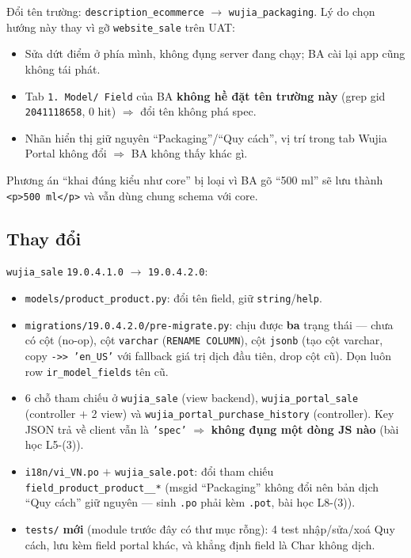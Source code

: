 Đổi tên trường: \texttt{description\_ecommerce} $\rightarrow$ \texttt{wujia\_packaging}. Lý do
chọn hướng này thay vì gỡ \texttt{website\_sale} trên UAT:

\begin{itemize}
  \item Sửa dứt điểm ở phía mình, không đụng server đang chạy; BA cài lại app cũng không tái phát.
  \item Tab \texttt{1. Model/ Field} của BA \textbf{không hề đặt tên trường này} (grep gid
    \texttt{2041118658}, 0 hit) $\Rightarrow$ đổi tên không phá spec.
  \item Nhãn hiển thị giữ nguyên ``Packaging''/``Quy cách'', vị trí trong tab Wujia Portal không
    đổi $\Rightarrow$ BA không thấy khác gì.
\end{itemize}

Phương án ``khai đúng kiểu như core'' bị loại vì BA gõ ``500 ml'' sẽ lưu thành
\texttt{<p>500 ml</p>} và vẫn dùng chung schema với core.

\subsection{Thay đổi}

\texttt{wujia\_sale} \texttt{19.0.4.1.0} $\rightarrow$ \texttt{19.0.4.2.0}:

\begin{itemize}
  \item \texttt{models/product\_product.py}: đổi tên field, giữ \texttt{string}/\texttt{help}.
  \item \texttt{migrations/19.0.4.2.0/pre-migrate.py}: chịu được \textbf{ba} trạng thái --- chưa
    có cột (no-op), cột \texttt{varchar} (\texttt{RENAME COLUMN}), cột \texttt{jsonb} (tạo cột
    varchar, copy \texttt{->> 'en\_US'} với fallback giá trị dịch đầu tiên, drop cột cũ). Dọn
    luôn row \texttt{ir\_model\_fields} tên cũ.
  \item 6 chỗ tham chiếu ở \texttt{wujia\_sale} (view backend), \texttt{wujia\_portal\_sale}
    (controller $+$ 2 view) và \texttt{wujia\_portal\_purchase\_history} (controller). Key JSON
    trả về client vẫn là \texttt{'spec'} $\Rightarrow$ \textbf{không đụng một dòng JS nào} (bài
    học L5-(3)).
  \item \texttt{i18n/vi\_VN.po} $+$ \texttt{wujia\_sale.pot}: đổi tham chiếu
    \texttt{field\_product\_product\_\_*} (msgid ``Packaging'' không đổi nên bản dịch ``Quy cách''
    giữ nguyên --- sinh \texttt{.po} phải kèm \texttt{.pot}, bài học L8-(3)).
  \item \texttt{tests/} \textbf{mới} (module trước đây có thư mục rỗng): 4 test nhập/sửa/xoá Quy
    cách, lưu kèm field portal khác, và khẳng định field là Char không dịch.
\end{itemize}

